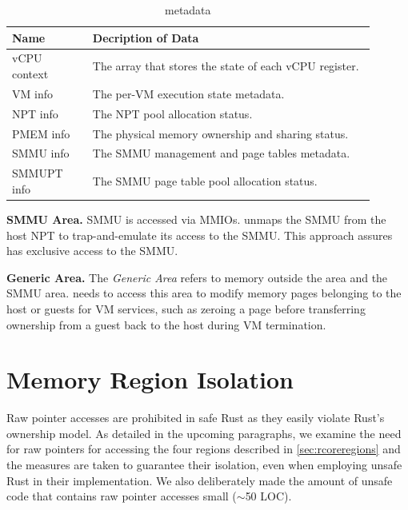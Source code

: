 \begin{table}
\begin{tabular}{ |p{0.2\linewidth}|p{0.7\linewidth}| }
\hline
\footnotesize \textbf{Name} & \footnotesize \textbf{Decription of Data} \\ \hline
\footnotesize vCPU context & \footnotesize The array that stores the state of each vCPU register. \\ \hline
\footnotesize VM info & \footnotesize The per-VM execution state metadata. \\ \hline
\footnotesize NPT info & \footnotesize The NPT pool allocation status. \\ \hline
\footnotesize PMEM info & \footnotesize The physical memory ownership and sharing status. \\ \hline
\footnotesize SMMU info & \footnotesize The SMMU management and page tables metadata. \\ \hline
\footnotesize SMMUPT info & \footnotesize The SMMU page table pool allocation status. \\ \hline
\end{tabular}
\vspace{0.2cm}
\caption{\rustcore{} metadata}
\label{tab:metadata}
\vspace{-0.4cm}
\end{table}

\textbf{SMMU Area.}
SMMU is accessed via MMIOs. \rustcore{} unmaps the SMMU
from the host NPT to trap-and-emulate its access to the SMMU. This
approach assures \rustcore{} has exclusive access to the SMMU.

\textbf{Generic Area.}
The \textit{Generic Area} refers to memory outside the \rustcore{} area and the SMMU area.
\rustcore{} needs to access this area to modify memory pages
belonging to the host or guests for VM services, such as zeroing a page
before transferring ownership from a guest back to the host during VM termination.

\section{Memory Region Isolation}

Raw pointer accesses are prohibited in safe Rust as they easily violate Rust’s
ownership model. As detailed in the upcoming paragraphs, we examine the need
for raw pointers for accessing the four regions described in \autoref{sec:rcoreregions}
and the measures are taken to guarantee their isolation,
even when employing unsafe Rust in their implementation.
We also deliberately made the
amount of unsafe code that contains raw pointer accesses small ($\sim$50 LOC).

